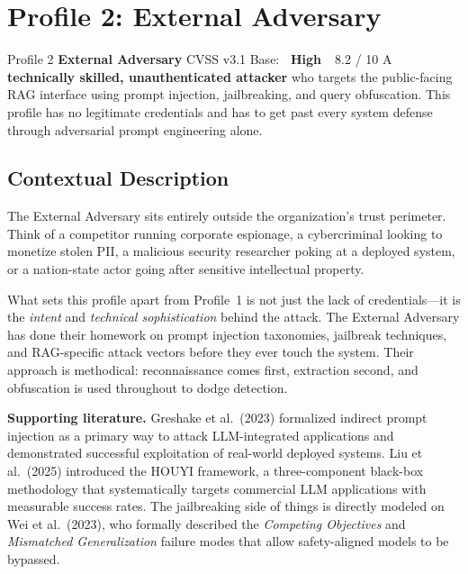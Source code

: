 \documentclass[12pt, a4paper]{report}
\newcommand{\badgehigh}{\colorbox{warn}{\color{white}\small\textbf{~High~}}}
\begin{document}
\newpage
\section{Profile 2: External Adversary}

\begin{profilebanner}%
  {Profile 2 \enspace\textbf{External Adversary}}%
  {CVSS v3.1 Base: \badgehigh\ 8.2 / 10}
  \small
  A \textbf{technically skilled, unauthenticated attacker} who targets the
  public-facing RAG interface using prompt injection, jailbreaking, and query
  obfuscation. This profile has no legitimate credentials and has to get past
  every system defense through adversarial prompt engineering alone.
\end{profilebanner}

\subsection{Contextual Description}

\begin{prosebox}
The External Adversary sits entirely outside the organization's trust
perimeter. Think of a competitor running corporate espionage, a cybercriminal
looking to monetize stolen PII, a malicious security researcher poking at a
deployed system, or a nation-state actor going after sensitive intellectual
property.

What sets this profile apart from Profile~1 is not just the lack of
credentials---it is the \emph{intent} and \emph{technical sophistication}
behind the attack. The External Adversary has done their homework on prompt
injection taxonomies, jailbreak techniques, and RAG-specific attack vectors
before they ever touch the system. Their approach is methodical:
reconnaissance comes first, extraction second, and obfuscation is used
throughout to dodge detection.

\medskip
\textbf{Supporting literature.}
Greshake et al.\ (2023) formalized indirect prompt injection as a primary way
to attack LLM-integrated applications and demonstrated successful exploitation
of real-world deployed systems. Liu et al.\ (2025) introduced the HOUYI
framework, a three-component black-box methodology that systematically
targets commercial LLM applications with measurable success rates. The
jailbreaking side of things is directly modeled on Wei et al.\ (2023),
who formally described the \emph{Competing Objectives} and
\emph{Mismatched Generalization} failure modes that allow safety-aligned
models to be bypassed.
\end{prosebox}
\end{document}
